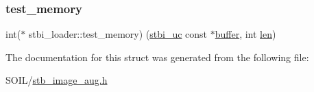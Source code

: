 \subsubsection{\texorpdfstring{test\+\_\+memory}{test\_memory}}
{\footnotesize\ttfamily int($\ast$ stbi\+\_\+loader\+::test\+\_\+memory) (\hyperlink{stb__image__aug_8h_a28eb51a1512ce382ee50f20e1d04d50d}{stbi\+\_\+uc} const $\ast$\hyperlink{glcorearb_8h_a76461e97a098d2c9ae20ac193d3825ae}{buffer}, int \hyperlink{glext_8h_a652168017ea9a8bbcead03d5c16269fb}{len})}



The documentation for this struct was generated from the following file\+:\begin{DoxyCompactItemize}
\item 
S\+O\+I\+L/\hyperlink{stb__image__aug_8h}{stb\+\_\+image\+\_\+aug.\+h}\end{DoxyCompactItemize}
